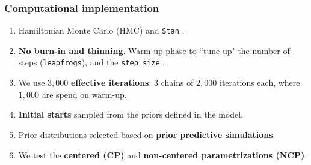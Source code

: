 \documentclass[arial,12pt,xcolor=dvipsnames]{beamer}
\begin{document}
\begin{frame}
	\frametitle{Computational implementation}
	\begin{enumerate}
		\item Hamiltonian Monte Carlo (HMC) and \texttt{Stan} \cite{Stan2020}.
		\item \textbf{No burn-in and thinning}. Warm-up phase to ``tune-up" the number of steps (\texttt{leapfrogs}), and the \texttt{step size} \cite{Stan2020}.
		\item We use $3,000$ \textbf{effective iterations}: $3$ chains of $2,000$ iterations each, where $1,000$ are spend on warm-up.
		\item \textbf{Initial starts} sampled from the priors defined in the model.
		\item Prior distributions selected based on \textbf{prior predictive simulations}.
		\item We test the \textbf{centered (CP)} and \textbf{non-centered parametrizations (NCP)}.
	\end{enumerate}
\end{frame}
%
%
%
\end{document}
